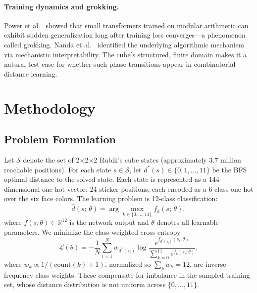 \documentclass[11pt]{article}
\begin{document}
\paragraph{Training dynamics and grokking.}
Power et al.~\cite{power2022grokking} showed that small transformers trained
on modular arithmetic can exhibit sudden generalization long after training loss
converges---a phenomenon called grokking. Nanda et al.~\cite{nanda2023grokking}
identified the underlying algorithmic mechanism via mechanistic interpretability.
The cube's structured, finite domain makes it a natural test case for whether
such phase transitions appear in combinatorial distance learning.

\section{Methodology}
\label{sec:method}

\subsection{Problem Formulation}

Let $\mathcal{S}$ denote the set of 2$\times$2$\times$2 Rubik's cube states
(approximately 3.7 million reachable positions). For each state
$s \in \mathcal{S}$, let $d^*(s) \in \{0, 1, \ldots, 11\}$ be the BFS optimal
distance to the solved state. Each state is represented as a 144-dimensional
one-hot vector: 24 sticker positions, each encoded as a 6-class one-hot over
the six face colors. The learning problem is 12-class classification:
\begin{equation}
  \hat{d}(s;\, \theta) = \arg\max_{k \in \{0,\ldots,11\}} f_k(s;\, \theta),
\end{equation}
where $f(s;\theta) \in \mathbb{R}^{12}$ is the network output and $\theta$
denotes all learnable parameters. We minimize the class-weighted cross-entropy
\begin{equation}
  \mathcal{L}(\theta) = -\frac{1}{N}\sum_{i=1}^{N}
    w_{d^*(s_i)} \log \frac{e^{f_{d^*(s_i)}(s_i;\theta)}}
                            {\sum_{k=0}^{11} e^{f_k(s_i;\theta)}},
  \label{eq:loss}
\end{equation}
where $w_k \propto 1/(\text{count}(k)+1)$, normalized so $\sum_k w_k = 12$,
are inverse-frequency class weights. These compensate for imbalance in the
sampled training set, whose distance distribution is not uniform across
$\{0, \ldots, 11\}$.
\end{document}
